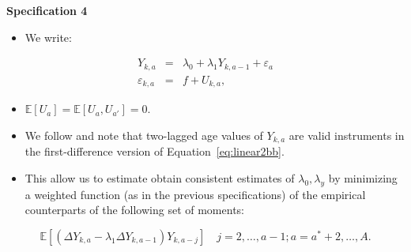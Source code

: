 \documentclass[static]{JJH-Beamer}
\begin{document}
\begin{frame}

\begin{center}
\textbf{Specification 4}
\end{center}

\end{frame}

\begin{frame}

\begin{itemize}
\item We write:
\end{itemize}

\begin{eqnarray}
Y_{k,a} &=& \lambda_{0} + \lambda_{1} Y_{k,a-1} + \varepsilon_{a} \label{eq:linear1bb} \\
\varepsilon_{k,a} &=& f + U_{k,a}, \label{eq:linear2bb}
\end{eqnarray}

\end{frame}

\begin{frame}

\begin{itemize}
\item $\mathbb{E}[U_{a}] = \mathbb{E}[U_{a}, U_{a'}] = 0$.
\item We follow \citet{Arellano_1991_Some-Tests} and note that two-lagged age values of $Y_{k,a}$ are valid instruments in the first-difference version of Equation~\ref{eq:linear2bb}.
\item This allow us to estimate obtain consistent estimates of $\lambda_{0}, \lambda_{y}$ by minimizing a weighted function (as in the previous specifications) of the empirical counterparts of the following set of moments:
\end{itemize}

\end{frame}

\begin{frame}

\begin{equation}
\mathbb{E} \left[ \left( \Delta Y_{k,a} -  \lambda_{1} \Delta Y_{k,a-1} \right)   Y_{k,a - j} \right] \quad j = 2, \ldots, a - 1; a = a^*+ 2, \ldots, A. \label{eq:abmoment}
\end{equation}

\end{frame}
\end{document}
